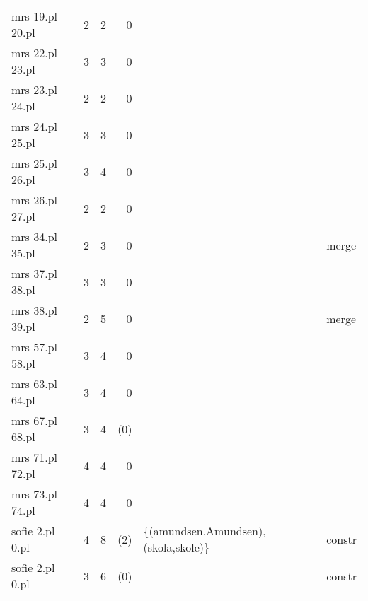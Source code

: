 \documentclass[11pt,a4paper,oneside,draft]{book}
\begin{document}
\begin{table}[htb]
\begin{center}
\begin{tabular}{lrrrll}
 mrs 19.pl 20.pl  &      2  &      2  &        0  &                                                &           \\
 mrs 22.pl 23.pl  &      3  &      3  &        0  &                                                &           \\
 mrs 23.pl 24.pl  &      2  &      2  &        0  &                                                &           \\
 mrs 24.pl 25.pl  &      3  &      3  &        0  &                                                &           \\
 mrs 25.pl 26.pl  &      3  &      4  &        0  &                                                &           \\
 mrs 26.pl 27.pl  &      2  &      2  &        0  &                                                &           \\
 mrs 34.pl 35.pl  &      2  &      3  &        0  &                                                &  merge    \\
 mrs 37.pl 38.pl  &      3  &      3  &        0  &                                                &           \\
 mrs 38.pl 39.pl  &      2  &      5  &        0  &                                                &  merge    \\
 mrs 57.pl 58.pl  &      3  &      4  &        0  &                                                &           \\
 mrs 63.pl 64.pl  &      3  &      4  &        0  &                                                &           \\
 mrs 67.pl 68.pl  &      3  &      4  &      (0)  &                                                &           \\
 mrs 71.pl 72.pl  &      4  &      4  &        0  &                                                &           \\
 mrs 73.pl 74.pl  &      4  &      4  &        0  &                                                &           \\
 sofie 2.pl 0.pl  &      4  &      8  &      (2)  &  \{(amundsen,Amundsen),(skola,skole)\}         &  constr   \\
 sofie 2.pl 0.pl  &      3  &      6  &      (0)  &                                                &  constr   \\
\end{tabular}
\end{center}
\end{table}
\end{document}
